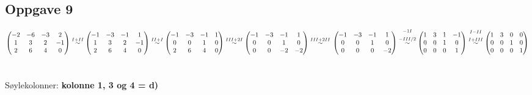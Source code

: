 \documentclass{article}
\newcommand{\vect}[1]{\begin{pmatrix} #1 \end{pmatrix}}
\newcommand{\eqqto}[1]{\overset{\substack{#1}}{\sim}}
\begin{document}
\subsection*{Oppgave 9}
\(\vect{-2&-6&-3&2 \\ 1&3&2&-1 \\ 2&6&4&0}
\eqqto{I+II}
\vect{-1&-3&-1&1 \\ 1&3&2&-1 \\ 2&6&4&0}
\eqqto{II+I}
\vect{-1&-3&-1&1 \\ 0&0&1&0 \\ 2&6&4&0}
\eqqto{III+2I}
\vect{-1&-3&-1&1 \\ 0&0&1&0 \\ 0&0&-2&-2}
\eqqto{III+2II}
\\\\
\vect{-1&-3&-1&1 \\ 0&0&1&0 \\ 0&0&0&-2}
\eqqto{-1I\\\\-III/2}
\vect{1&3&1&-1 \\ 0&0&1&0 \\ 0&0&0&1}
\eqqto{I-II\\\\I+III}
\vect{1&3&0&0 \\ 0&0&1&0 \\ 0&0&0&1}
\)
\\\\\\
Søylekolonner: \qquad \textbf{kolonne 1, 3 og 4 = d)}
\\
\end{document}
